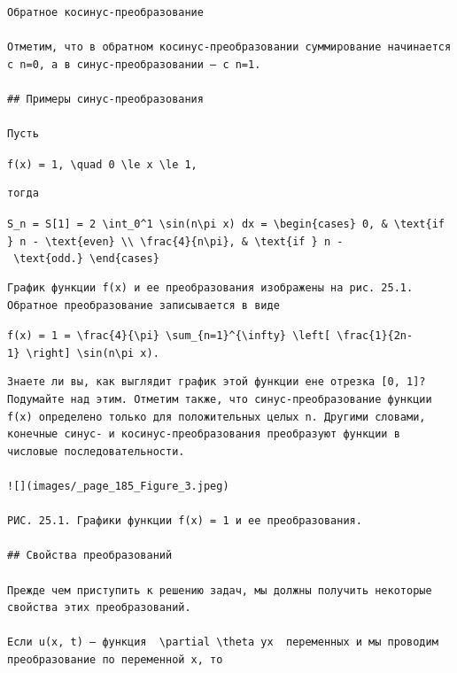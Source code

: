 \documentclass[
  ukrainian,
]{article}
\begin{document}
\begin{verbatim}
Обратное косинус-преобразование

Отметим, что в обратном косинус-преобразовании суммирование начинается с n=0, а в синус-преобразовании — с n=1.

## Примеры синус-преобразования

Пусть
\end{verbatim}

\texttt{f(x)\ =\ 1,\ \textbackslash{}quad\ 0\ \textbackslash{}le\ x\ \textbackslash{}le\ 1,}

\begin{verbatim}
тогда
\end{verbatim}

\texttt{S\_n\ =\ S{[}1{]}\ =\ 2\ \textbackslash{}int\_0\^{}1\ \textbackslash{}sin(n\textbackslash{}pi\ x)\ dx\ =\ \textbackslash{}begin\{cases\}\ 0,\ \&\ \textbackslash{}text\{if\ \}\ n\ -\ \textbackslash{}text\{even\}\ \textbackslash{}\textbackslash{}\ \textbackslash{}frac\{4\}\{n\textbackslash{}pi\},\ \&\ \textbackslash{}text\{if\ \}\ n\ -\ \textbackslash{}text\{odd.\}\ \textbackslash{}end\{cases\}}

\begin{verbatim}
График функции f(x) и ее преобразования изображены на рис. 25.1. Обратное преобразование записывается в виде
\end{verbatim}

\texttt{f(x)\ =\ 1\ =\ \textbackslash{}frac\{4\}\{\textbackslash{}pi\}\ \textbackslash{}sum\_\{n=1\}\^{}\{\textbackslash{}infty\}\ \textbackslash{}left{[}\ \textbackslash{}frac\{1\}\{2n-1\}\ \textbackslash{}right{]}\ \textbackslash{}sin(n\textbackslash{}pi\ x).}

\begin{verbatim}
Знаете ли вы, как выглядит график этой функции ене отрезка [0, 1]? Подумайте над этим. Отметим также, что синус-преобразование функции f(x) определено только для положительных целых n. Другими словами, конечные синус- и косинус-преобразования преобразуют функции в числовые последовательности.

![](images/_page_185_Figure_3.jpeg)

РИС. 25.1. Графики функции f(x) = 1 и ее преобразования.

## Свойства преобразований

Прежде чем приступить к решению задач, мы должны получить некоторые свойства этих преобразований.

Если u(x, t) — функция  \partial \theta yx  переменных и мы проводим преобразование по переменной x, то
\end{verbatim}
\end{document}
